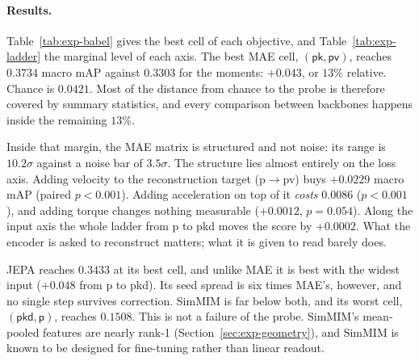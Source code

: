 \paragraph{Results.} Table~\ref{tab:exp-babel} gives the best cell of each objective, and
Table~\ref{tab:exp-ladder} the marginal level of each axis. The best MAE cell,
$(\textsf{pk},\textsf{pv})$, reaches $0.3734$ macro mAP against $0.3303$ for the moments:
$+0.043$, or $13\%$ relative. Chance is $0.0421$. Most of the distance from chance to the
probe is therefore covered by summary statistics, and every comparison between backbones
happens inside the remaining $13\%$.

Inside that margin, the MAE matrix is structured and not noise: its range is $10.2\sigma$
against a noise bar of $3.5\sigma$. The structure lies almost entirely on the loss axis.
Adding velocity to the reconstruction target (\textsf{p}$\to$\textsf{pv}) buys $+0.0229$
macro mAP (paired $p<0.001$). Adding acceleration on top of it \emph{costs} $0.0086$
($p<0.001$), and adding torque changes nothing measurable ($+0.0012$, $p=0.054$). Along the
input axis the whole ladder from \textsf{p} to \textsf{pkd} moves the score by $+0.0002$.
What the encoder is asked to reconstruct matters; what it is given to read barely does.

JEPA reaches $0.3433$ at its best cell, and unlike MAE it is best with the widest input
($+0.048$ from \textsf{p} to \textsf{pkd}). Its seed spread is six times MAE's, however, and
no single step survives correction.
SimMIM is far below both, and its worst cell, $(\textsf{pkd},\textsf{p})$, reaches $0.1508$.
This is not a failure of the probe. SimMIM's mean-pooled features are nearly rank-1
(Section~\ref{sec:exp-geometry}), and SimMIM is known to be designed for fine-tuning
rather than linear readout.


